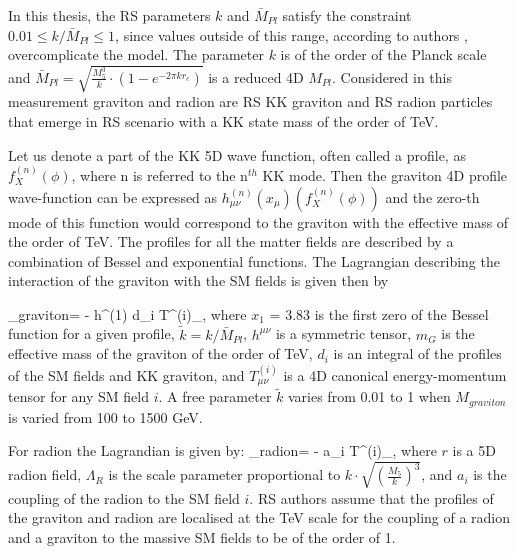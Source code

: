 In this thesis, the RS parameters $k$ and $\bar{M}_{Pl}$ satisfy the constraint $0.01 \leq k / \bar{M}_{Pl} \leq 1$, since values outside of this range, according to authors \cite{Davoudiasl:1999jd}, overcomplicate the model. The parameter $k$ is of the order of the Planck scale and $\bar{M}_{Pl} = \sqrt{\frac{M^3_5}{k} \cdot (1 - e^{-2\pi k r_c} ) }$ is a reduced 4D $M_{Pl}$. Considered in this measurement graviton and radion are RS KK graviton and RS radion particles that emerge in RS scenario with a KK state mass of the order of TeV. 

Let us denote a part of the KK 5D wave function, often called a profile, as $f^{(n)}_X(\phi)$, where n is referred to the n$^{th}$ KK mode. Then the graviton 4D profile wave-function can be expressed as $h^{(n)}_{\mu\nu}(x_\mu)(f^{(n)}_X(\phi))$ and the zero-th mode of this function would correspond to the graviton with the effective mass of the order of TeV. The profiles for all the matter fields are described by a combination of Bessel and exponential functions. The Lagrangian describing the interaction of the graviton with the SM fields is given then by 

\beqn\label{lagr_graviton}
\Lagr_{graviton}=  -  h^{\mu\nu(1)} \times d_i T^{(i)}_{\mu\nu},  
\eeqn
where $x_1$ = 3.83 is the first zero of the Bessel function for a given profile, $\tilde{k}  = k / \bar{M}_{Pl}$, $h^{\mu\nu}$ is a symmetric tensor, $m_G$ is the effective mass of the graviton of the order of TeV, $d_i$ is an integral of the profiles of the SM fields and KK graviton, and  $T^{(i)}_{\mu\nu}$ is a 4D canonical energy-momentum tensor \cite{Forger:2003ut} for any SM field $i$. A free parameter $\tilde{k}$ varies from 0.01 to 1 when $M_{graviton}$ is varied from 100 to 1500 GeV. 

For radion the Lagrandian is given by:
\beqn\label{lagr_radion}
\Lagr_{radion}=  -  \times a_i T^{\mu (i)}_{\mu},  
\eeqn
where $r$ is a 5D radion field, $\Lambda_R$ is the scale parameter proportional to $k \cdot \sqrt{ ( \frac{M_5}{k} )^3}$, and $a_i$ is the coupling of the radion to the SM field $i$. RS authors assume that the profiles of the graviton and radion are localised at the TeV scale for the coupling of a radion and a graviton to the massive SM fields to be of the order of 1. 





